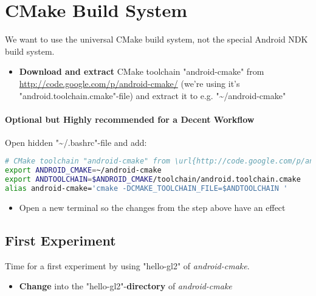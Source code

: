 \section{CMake Build System}
We want to use the universal CMake build system, not the special Android NDK build system.

\begin{itemize}
\item{\textbf{Download and extract} CMake toolchain "android-cmake" from \url{http://code.google.com/p/android-cmake/} (we're using it's "android.toolchain.cmake"-file) and extract it to e.g. "\textasciitilde /android-cmake"}
\end{itemize}


\paragraph{Optional but Highly recommended for a Decent Workflow}
Open hidden "\textasciitilde /.bashrc"-file and add:
\begin{lstlisting}[language=bash]
# CMake toolchain "android-cmake" from \url{http://code.google.com/p/android-cmake/}
export ANDROID_CMAKE=~/android-cmake
export ANDTOOLCHAIN=$ANDROID_CMAKE/toolchain/android.toolchain.cmake
alias android-cmake='cmake -DCMAKE_TOOLCHAIN_FILE=$ANDTOOLCHAIN '
\end{lstlisting}
\begin{itemize}
\item{Open a new terminal so the changes from the step above have an effect}
\end{itemize}



\subsection{First Experiment}
Time for a first experiment by using "hello-gl2" of \emph{android-cmake}.

\begin{itemize}
\item{\textbf{Change} into the "hello-gl2"-\textbf{directory} of \emph{android-cmake}}
\end{itemize}


